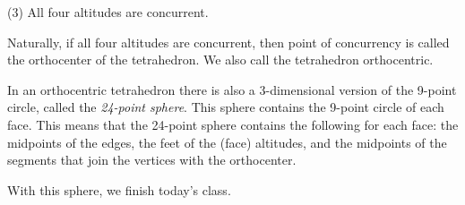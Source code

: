 (3) All four altitudes are concurrent.

Naturally, if all four altitudes are concurrent, then point of concurrency is called the orthocenter of the tetrahedron. We also call the tetrahedron orthocentric.

In an orthocentric tetrahedron there is also a 3-dimensional version of the 9-point circle, called the \emph{24-point sphere}. This sphere contains the 9-point circle of each face. This means that the 24-point sphere contains the following for each face: the midpoints of the edges, the feet of the (face) altitudes, and the midpoints of the segments that join the vertices with the orthocenter.

With this sphere, we finish today's class. 




